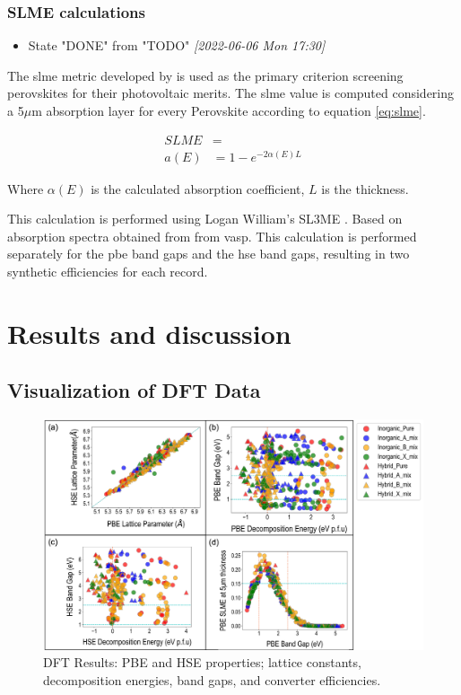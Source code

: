 \documentclass[twoside, twocolumn, 9pt, draft]{article}
\begin{document}
\subsubsection*{SLME calculations}
\label{sec:orgc4789c2}
\begin{itemize}
\item State "DONE"       from "TODO"       \textit{[2022-06-06 Mon 17:30]}
\end{itemize}
The \gls{slme} metric developed by \citet{yu-2012-ident-poten} is used as the
primary criterion screening perovskites for their photovoltaic
merits. The \gls{slme} value is computed considering a 5\(\mu\)m absorption
layer for every Perovskite according to equation \eqref{eq:slme}.

\begin{equation}\label{eq:slme}
\begin{align*}
SLME&= \\
a(E)&=1-e^{-2\alpha(E)L}
\end{align*}
\end{equation}

Where \(\alpha(E)\) is the calculated absorption coefficient, \(L\) is
the thickness.

This calculation is performed using Logan William's SL3ME
\cite{williams-2022-sl3me}. Based on absorption spectra obtained from
from \gls{vasp}. This calculation is performed separately for the \acrshort{pbe} band
gaps and the \acrshort{hse} band gaps, resulting in two synthetic efficiencies
for each record.

\section*{Results and discussion}
\label{sec:orgb32fdef}
\subsection*{Visualization of DFT Data}
\label{sec:org494c58d}
\begin{figure}
\centering
\includegraphics[width=.9\linewidth]{./figs/screening_properties.png}
\caption{\label{fig:pairplots} DFT Results: PBE and HSE properties; lattice constants, decomposition energies, band gaps, and converter efficiencies.}
\end{figure}
\end{document}
